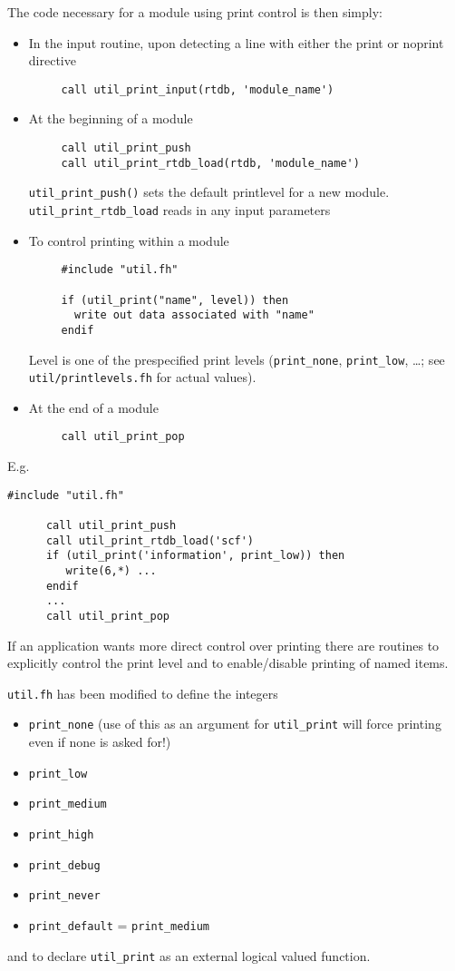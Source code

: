 \sloppy
The code necessary for a module using print control is then simply:
\begin{itemize}
\item In the input routine, upon detecting a line with either the print
  or noprint directive
\begin{verbatim}
     call util_print_input(rtdb, 'module_name')
\end{verbatim}
\item At the beginning of a module
\begin{verbatim}
     call util_print_push 
     call util_print_rtdb_load(rtdb, 'module_name')
\end{verbatim}
  \verb+util_print_push()+ sets the default printlevel for a new
  module. \verb+util_print_rtdb_load+ reads in any input parameters
\item To control printing within a module
\begin{verbatim}
     #include "util.fh"

     if (util_print("name", level)) then
       write out data associated with "name"
     endif
\end{verbatim}
  Level is one of the prespecified print levels (\verb+print_none+,
  \verb+print_low+, \ldots; see \verb+util/printlevels.fh+ for
  actual values).
\item At the end of a module
\begin{verbatim}
     call util_print_pop
\end{verbatim}
\end{itemize}

\fussy

 E.g.
\begin{verbatim}
#include "util.fh"

      call util_print_push
      call util_print_rtdb_load('scf')
      if (util_print('information', print_low)) then
         write(6,*) ...
      endif
      ...
      call util_print_pop
\end{verbatim}

 If an application wants more direct control over printing there are
routines to explicitly control the print level and to enable/disable
printing of named items.

{\tt util.fh} has been modified to define the integers
\begin{itemize}
\item \verb+print_none+ (use of this as an argument for
  \verb+util_print+ will force printing even if none is asked for!)
\item \verb+print_low+
\item \verb+print_medium+
\item \verb+print_high+
\item \verb+print_debug+
\item \verb+print_never+
\item \verb+print_default+ = \verb+print_medium+
\end{itemize}
and to declare \verb+util_print+ as an external logical valued function.

